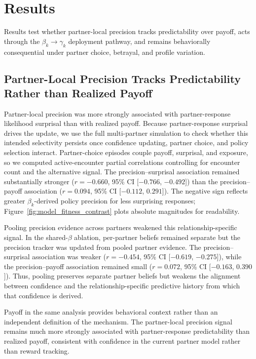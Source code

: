 \documentclass[runningheads,orivec]{llncs}
\begin{document}
\section{Results}
\label{sec:results}

Results test whether partner-local precision tracks predictability over payoff, acts through the \(\beta_k \rightarrow \gamma_k\) deployment pathway, and remains behaviorally consequential under partner choice, betrayal, and profile variation.

\subsection{Partner-Local Precision Tracks Predictability Rather than Realized Payoff}
\label{sec:predictability_value}

Partner-local precision was more strongly associated with partner-response likelihood surprisal than with realized payoff. Because partner-response surprisal drives the update, we use the full multi-partner simulation to check whether this intended selectivity persists once confidence updating, partner choice, and policy selection interact. Partner-choice episodes couple payoff, surprisal, and exposure, so we computed active-encounter partial correlations controlling for encounter count and the alternative signal. The precision--surprisal association remained substantially stronger ($r=-0.660$, 95\% CI [$-0.766$, $-0.492$]) than the precision--payoff association ($r=0.094$, 95\% CI [$-0.112$, $0.291$]). The negative sign reflects greater $\beta_k$-derived policy precision for less surprising responses; Figure~\ref{fig:model_fitness_contrast} plots absolute magnitudes for readability.

Pooling precision evidence across partners weakened this relationship-specific signal. In the shared-$\beta$ ablation, per-partner beliefs remained separate but the precision tracker was updated from pooled partner evidence. The precision--surprisal association was weaker ($r=-0.454$, 95\% CI [$-0.619$, $-0.275$]), while the precision--payoff association remained small ($r=0.072$, 95\% CI [$-0.163$, $0.390$]). Thus, pooling preserves separate partner beliefs but weakens the alignment between confidence and the relationship-specific predictive history from which that confidence is derived.

Payoff in the same analysis provides behavioral context rather than an independent definition of the mechanism. The partner-local precision signal remains much more strongly associated with partner-response predictability than realized payoff, consistent with confidence in the current partner model rather than reward tracking.
\end{document}
